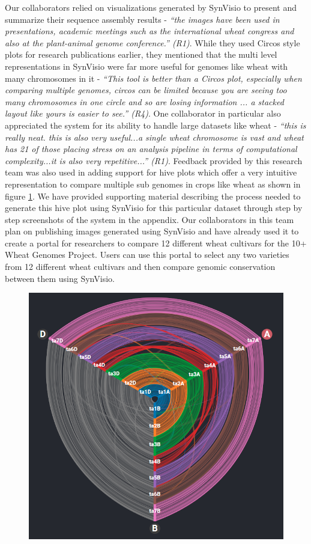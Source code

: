 Our collaborators relied on visualizations generated by SynVisio to present and summarize their sequence assembly results - \textit{``the images have been used in presentations, academic meetings such as the international wheat congress and also at the plant-animal genome conference.'' (R1)}. While they used Circos style plots for research publications earlier, they mentioned that the multi level representations in SynVisio were far more useful for genomes like wheat with many chromosomes in it - \textit{``This tool is better than a Circos plot, especially when comparing multiple genomes, circos can be limited because you are seeing too many chromosomes in one circle and so are losing information ... a stacked layout like yours is easier to see.'' (R4)}. One collaborator in particular also appreciated the system for its ability to handle large datasets like wheat - \textit{``this is really neat. this is also very useful...a single wheat chromosome is vast and wheat has 21 of those placing stress on an analysis pipeline in terms of computational complexity...it is also very repetitive...'' (R1)}.
Feedback provided by this research team was also used in adding support for hive plots which offer a very intuitive representation to compare multiple sub genomes in crops like wheat as shown in figure \ref{fig:ch_6_wheat}. We have provided supporting material describing the process needed to generate this hive plot using SynVisio for this particular dataset through step by step screenshots of the system in the appendix. Our collaborators in this team plan on publishing images generated using SynVisio and have already used it to create a portal for researchers to compare 12 different wheat cultivars for the 10+ Wheat Genomes Project. Users can use this portal to select any two varieties from 12 different wheat cultivars and then compare genomic conservation between them using SynVisio\cite{10wheat,wheatinfogithub}.

\begin{figure}
  \centering
  \includegraphics[width=0.50\linewidth]{images/ch_6_wheat.PNG}
  \label{fig:ch_6_wheat}
\end{figure}


